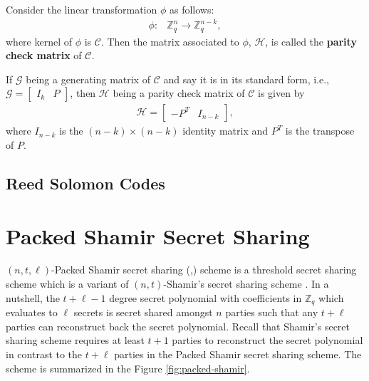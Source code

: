 \begin{definition}
  Consider the linear transformation $\phi$ as follows:
  \begin{align*}
    \phi:& \mathbb{Z}_q^n \rightarrow \mathbb{Z}_q^{n-k},
  \end{align*}
  where kernel of $\phi$ is $\mathcal{C}$. Then the matrix associated to $\phi$, $\mathcal{H}$, 
  is called the \textbf{parity check matrix} of $\mathcal{C}$.
\end{definition}

\begin{lemma}
  If $\mathcal{G}$ being a generating matrix of $\mathcal{C}$ and say it is in its standard form, i.e., $\mathcal{G} = \begin{bmatrix}
    I_k & P
  \end{bmatrix}$, then $\mathcal{H}$ being a parity check matrix of $\mathcal{C}$ is given by
  \begin{align*}
    \mathcal{H} = \begin{bmatrix}
      -P^T & I_{n-k}
    \end{bmatrix},
  \end{align*}
  where $I_{n-k}$ is the $(n-k)\times (n-k)$ identity matrix and $P^T$ is the transpose of $P$.
\end{lemma}

\subsection{Reed Solomon Codes}
\label{subsec:reed-solomon}


\section{Packed Shamir Secret Sharing}
\label{sec:packed-shamir}
$(n,t,\ell)$-Packed Shamir secret sharing (\cite{10.1145/129712.129780},\cite{crypto-1984-905})
 scheme is a threshold secret sharing scheme which is a variant of $(n,t)$-Shamir's 
 secret sharing scheme \cite{10.1145/359168.359176}. In a nutshell, the $t+\ell-1$ 
 degree secret polynomial with coefficients in $\mathbb{Z}_q$ which evaluates to $\ell$ 
 secrets is secret shared amongst $n$ parties such that any $t+\ell$ parties can 
 reconstruct back the secret polynomial. Recall that Shamir's secret sharing scheme 
 requires at least $t+1$ parties to reconstruct the secret polynomial in contrast to 
 the $t+\ell$ parties in the Packed Shamir secret sharing scheme. The scheme is
 summarized in the Figure \ref{fig:packed-shamir}.


